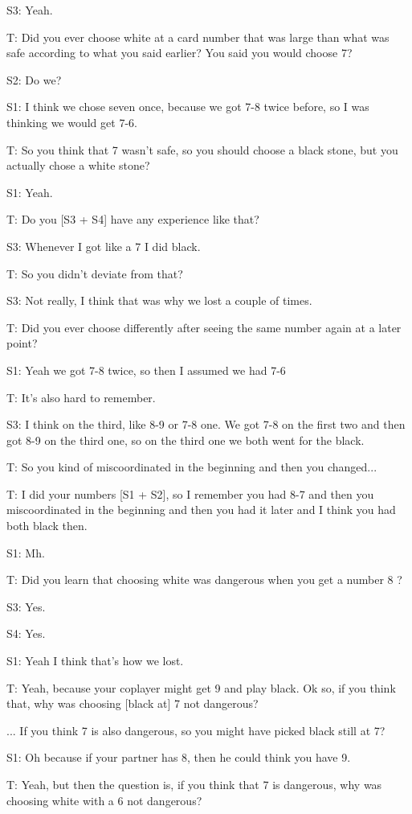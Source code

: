 S3: Yeah.

T: Did you ever choose white at a card number that was large than what was safe according to what you said earlier? You said you would choose 7?

S2: Do we?

S1: I think we chose seven once, because we got 7-8 twice before, so I was thinking we would get 7-6.

T: So you think that 7 wasn't safe, so you should choose a black stone, but you actually chose a white stone?

S1: Yeah.

T: Do you [S3 + S4] have any experience like that?

S3: Whenever I got like a 7 I did black.

T: So you didn't deviate from that?

S3: Not really, I think that was why we lost a couple of times.

T: Did you ever choose differently after seeing the same number again at a later point?

S1: Yeah we got 7-8 twice, so then I assumed we had 7-6

T: It's also hard to remember.

S3: I think on the third, like 8-9 or 7-8 one. We got 7-8 on the first two and then got 8-9 on the third one, so on the third one we both went for the black.

T: So you kind of miscoordinated in the beginning and then you changed...

T: I did your numbers [S1 + S2], so I remember you had 8-7 and then you miscoordinated in the beginning and then you had it later and I think you had both black then.

S1: Mh.

T: Did you learn that choosing white was dangerous when you get a number 8 ?

S3: Yes.

S4: Yes.

S1: Yeah I think that's how we lost.

T: Yeah, because your coplayer might get 9 and play black. Ok so, if you think that, why was choosing [black at] 7 not dangerous? 

... If you think 7 is also dangerous, so you might have picked black still at 7?

S1: Oh because if your partner has 8, then he could think you have 9.

T: Yeah, but then the question is, if you think that 7 is dangerous, why was choosing white with a 6 not dangerous?

